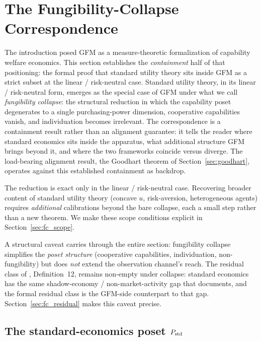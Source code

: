 \section{The Fungibility-Collapse Correspondence}
\label{sec:fungibility_collapse}

The introduction posed GFM as a measure-theoretic formalization
of capability welfare economics.  This section establishes the
\emph{containment} half of that positioning: the formal proof
that standard utility theory sits inside GFM as a strict subset
at the linear / risk-neutral case.  Standard utility theory, in
its linear / risk-neutral form, emerges as the special case of
GFM under what we call \emph{fungibility collapse}: the
structural reduction in which the capability poset degenerates
to a single purchasing-power dimension, cooperative capabilities
vanish, and individuation becomes irrelevant.  The correspondence
is a containment result rather than an alignment guarantee: it
tells the reader where standard economics sits inside the
apparatus, what additional structure GFM brings beyond it, and
where the two frameworks coincide versus diverge.  The
load-bearing alignment result, the Goodhart theorem of
Section~\ref{sec:goodhart}, operates against this established
containment as backdrop.

The reduction is exact only in the linear / risk-neutral case.
Recovering broader content of standard utility theory (concave $u$,
risk-aversion, heterogeneous agents) requires \emph{additional}
calibrations beyond the bare collapse, each a small step rather than
a new theorem.  We make these scope conditions explicit in
Section~\ref{sec:fc_scope}.

A structural caveat carries through the entire section: fungibility
collapse simplifies the \emph{poset structure} (cooperative
capabilities, individuation, non-fungibility) but does \emph{not}
extend the observation channel's reach.  The residual class of
\citep[Need~Sufficiency]{lasser2026paper8b}, Definition~12, remains
non-empty under collapse: standard economics has the same
shadow-economy / non-market-activity gap that
\citep{stiglitz2009report} documents, and the formal residual class
is the GFM-side counterpart to that gap.  Section~\ref{sec:fc_residual}
makes this caveat precise.

\subsection{The standard-economics poset $P_{\mathrm{std}}$}
\label{sec:fc_pstd}


